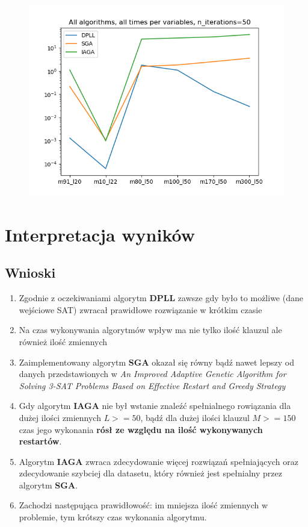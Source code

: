 \documentclass[10pt]{article}
\begin{document}
\begin{figure}[h]
\centering
\includegraphics[scale=0.75]{img/plot1.png} \\
\end{figure}

\section{Interpretacja wyników}
\subsection{Wnioski}
\begin{enumerate}
  \item Zgodnie z oczekiwaniami algorytm \textbf{DPLL} zawsze gdy było to możliwe (dane wejściowe SAT) zwracał prawidłowe rozwiązanie w krótkim czasie
  \item Na czas wykonywania algorytmów wpływ ma nie tylko ilość klauzul ale również ilość zmiennych
  \item Zaimplementowany algorytm \textbf{SGA} okazał się równy bądź nawet lepszy od danych przedstawionych w \textit{An Improved Adaptive Genetic Algorithm for Solving 3-SAT Problems Based on Effective Restart and Greedy Strategy}
  \item Gdy algorytm \textbf{IAGA} nie był wstanie znaleźć spełnialnego rowiązania dla dużej ilości zmiennych $L >= 50$, bądź dla dużej ilości klauzul $M >= 150$ czas jego wykonania \textbf{rósł ze względu na ilość wykonywanych restartów}.
  \item Algorytm \textbf{IAGA} zwraca zdecydowanie więcej rozwiązań spełniających oraz zdecydowanie szybciej dla datasetu, który również jest spełnialny przez algorytm \textbf{SGA}.
  \item Zachodzi następująca prawidłowość: im mniejsza ilość zmiennych w problemie, tym krótszy czas wykonania algorytmu.
\end{enumerate}
\end{document}
